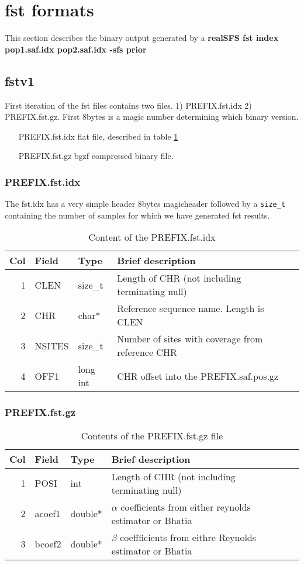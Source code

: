 \documentclass[10pt]{article}
\begin{document}
\clearpage
\section{fst formats}
This section describes the binary output generated by a \textbf{realSFS fst index pop1.saf.idx pop2.saf.idx -sfs prior}
\subsection{fstv1}

First iteration of the fst files contains two files. 1) PREFIX.fst.idx 2) PREFIX.fst.gz.
First 8bytes is a magic number determining which binary version.


\begin{itemize}
\item[PREFIX.fst.idx] flat file, described in table \ref{tab2}
\item[PREFIX.fst.gz] bgzf compressed binary file.
\end{itemize}
\subsubsection{PREFIX.fst.idx}
The fst.idx has a very simple header 8bytes magicheader followed by a \texttt{size\_t} containing the number of samples for which we have generated fst results.
\begin{table}[h]
\begin{tabular}{rllll}
  \hline
  {\bf Col} & {\bf Field} & {\bf Type} & {\bf Brief description} \\
  \hline
  1 & {\sf CLEN} & size\_t &  Length of CHR (not including terminating null)\\
  2 & {\sf CHR} & char* & Reference sequence name. Length is CLEN\\
  3 & {\sf NSITES} & size\_t & Number of sites with coverage from reference CHR\\
  4 & {\sf OFF1} & long int & CHR offset into the PREFIX.saf.pos.gz \\
  \hline
\end{tabular}\label{tab2}
\caption{Content of the PREFIX.fst.idx}
\end{table}
\subsubsection{PREFIX.fst.gz}
\begin{table}[h]
\begin{tabular}{rllll}
  \hline
  {\bf Col} & {\bf Field} & {\bf Type} & {\bf Brief description} \\
  \hline
  1 & {\sf POSI} & int &  Length of CHR (not including terminating null)\\
  2 & {\sf acoef1} & double* & $\alpha$ coefficients from either reynolds estimator or Bhatia \\
  3 & {\sf bcoef2} & double* & $\beta$ coeffficients from eithre Reynolds estimator or Bhatia\\
  \hline
\end{tabular}\label{tabfstgz}
\caption{Contents of the PREFIX.fst.gz file}
\end{table}
\end{document}
